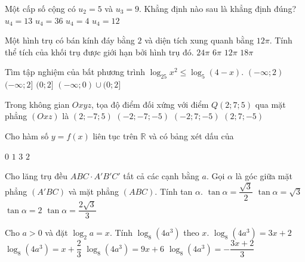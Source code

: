 \begin{ex}%
Một cấp số cộng có $u_2=5$ và $u_3=9$. Khẳng định nào sau là khẳng định đúng?
\choice
{\True $u_4=13$}
{$u_4=36$}
{$u_4=4$}
{$u_4=12$}

\end{ex}
\begin{ex}%
Một hình trụ có bán kính đáy bằng $2$ và diện tích xung quanh bằng $12\pi$. Tính thể tích của khối trụ được giới hạn bởi hình trụ đó.
\choice
{$24\pi$}
{$6\pi$}
{\True $12\pi$}
{$18\pi$}

\end{ex}
\begin{ex}%
Tìm tập nghiệm của bất phương trình $\log_{25} x^2 \leq \log_5(4-x)$.
\choice
{$(-\infty; 2)$}
{$(-\infty; 2]$}
{$(0; 2]$}
{\True $(-\infty; 0) \cup(0; 2]$}

\end{ex}
\begin{ex}%
Trong không gian $O x y z$, tọa độ điểm đối xứng với điểm $Q(2; 7; 5)$ qua mặt phẳng $(O x z)$ là
\choice
{\True $(2;-7; 5)$}
{$(-2;-7;-5)$}
{$(-2; 7;-5)$}
{$(2; 7;-5)$}

\end{ex}
\begin{ex}%
Cho hàm số $y=f(x)$ liên tục trên $\mathbb{R}$ và có bảng xét dấu của 
{
}
\choice
{$0$}
{\True $1$}
{$3$}
{$2$}
\end{ex}
\begin{ex}%
Cho lăng trụ đều $ABC \cdot A'B'C'$ tất cả các cạnh bằng $a$. Gọi $\alpha$ là góc giữa mặt phẳng $\left(A'BC\right)$ và mặt phẳng $(ABC)$. Tính tan $\alpha$.
\choice
{$\tan \alpha=\dfrac{\sqrt{3}}{2}$}
{$\tan \alpha=\sqrt{3}$}
{$\tan \alpha=2$}
{\True $\tan \alpha=\dfrac{2\sqrt{3}}{3}$}

\end{ex}
\begin{ex}%
Cho $a>0$ và đặt $\log_2 a=x$. Tính $\log_8\left(4 a^3\right)$ theo $x$.
\choice
{$\log_8\left(4 a^3\right)=3 x+2$}
{\True $\log_8\left(4 a^3\right)=x+\dfrac{2}{3}$}
{$\log_8\left(4 a^3\right)=9 x+6$}
{$\log_8\left(4 a^3\right)=-\dfrac{3 x+2}{3}$}

\end{ex}
